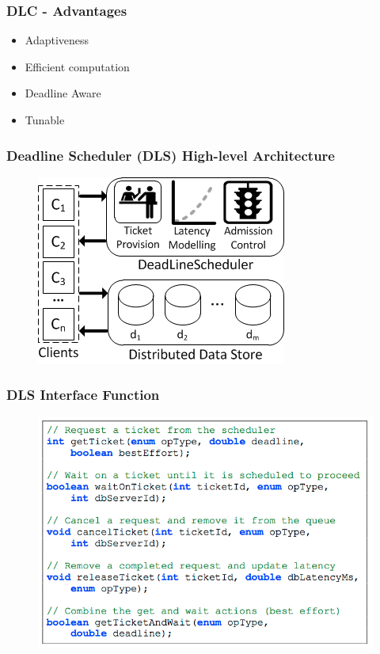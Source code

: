 \documentclass{beamer}
\begin{document}
\begin{frame}
\frametitle{DLC - Advantages}
\begin{itemize}
\item Adaptiveness
\item Efficient computation
\item Deadline Aware
\item Tunable
\end{itemize}
\end{frame}


\begin{frame}
\frametitle{Deadline Scheduler (DLS) High-level Architecture}
  \begin{figure}
    \begin{center}
      \centerline{\includegraphics[scale=0.90]{img/DLS.png}}
    \end{center}
  \end{figure}
\end{frame}

\begin{frame}
\frametitle{DLS Interface Function}
  \begin{figure}
    \begin{center}
      \centerline{\includegraphics[scale=0.40]{img/DLS_interface.png}}
    \end{center}
  \end{figure}
\end{frame}
\end{document}
